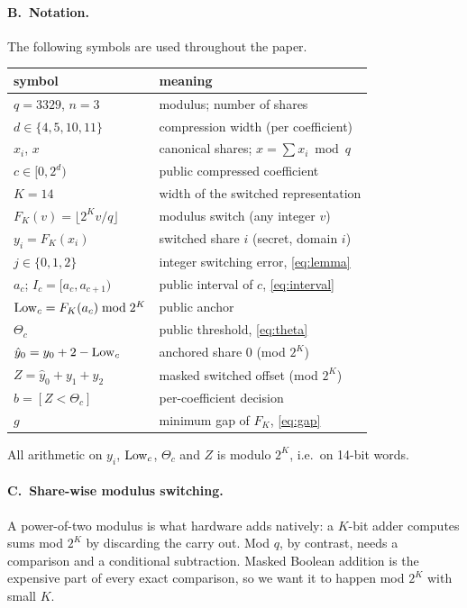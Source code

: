 \paragraph{B.~Notation.} The following symbols are used throughout the paper.
\begin{center}\footnotesize
\begin{tabularx}{\columnwidth}{@{}>{\raggedright\arraybackslash}p{3.0cm}X@{}}
\toprule
symbol & meaning \\
\midrule
$q = 3329$, $n = 3$ & modulus; number of shares \\
$d \in \{4,5,10,11\}$ & compression width (per coefficient) \\
$x_i$, $x$ & canonical shares; $x = \sum x_i \bmod q$ \\
$c \in [0, 2^d)$ & public compressed coefficient \\
$K = 14$ & width of the switched representation \\
$F_K(v) = \lfloor 2^K v / q \rfloor$ & modulus switch (any integer $v$) \\
$y_i = F_K(x_i)$ & switched share $i$ (secret, domain $i$) \\
$j \in \{0,1,2\}$ & integer switching error, \cref{eq:lemma} \\
$a_c$; $I_c = [a_c, a_{c+1})$ & public interval of $c$, \cref{eq:interval} \\
$\mathrm{Low}_c = F_K(a_c) \bmod 2^K$ & public anchor \\
$\Theta_c$ & public threshold, \cref{eq:theta} \\
$\hat y_0 = y_0 + 2 - \mathrm{Low}_c$ & anchored share 0 (mod $2^K$) \\
$Z = \hat y_0 + y_1 + y_2$ & masked switched offset (mod $2^K$) \\
$b = [Z < \Theta_c]$ & per-coefficient decision \\
$g$ & minimum gap of $F_K$, \cref{eq:gap} \\
\bottomrule
\end{tabularx}
\end{center}
All arithmetic on $y_i$, $\mathrm{Low}_c$, $\Theta_c$ and $Z$ is modulo $2^K$, i.e.\ on 14-bit words.

\paragraph{C.~Share-wise modulus switching.}
A power-of-two modulus is what hardware adds natively: a $K$-bit adder computes sums mod $2^K$ by discarding the carry out. Mod $q$, by contrast, needs a comparison and a conditional subtraction. Masked Boolean addition is the expensive part of every exact comparison, so we want it to happen mod $2^K$ with small $K$.

